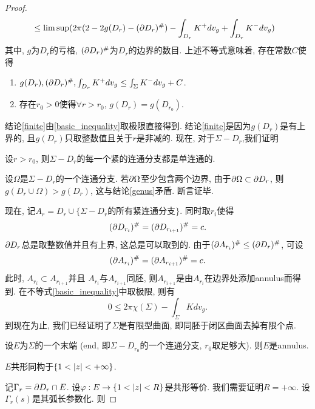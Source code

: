 \begin{proof}
\begin{equation}
\begin{split}
            & \le \limsup (2\pi(2-2g(D_r)-(\P D_r)^\#)-\int_{D_r}K^+dv_g+\int_{D_r}K^-dv_g)
        \end{split}
    \end{equation}
    其中, $g$为$D_r$的亏格, $(\P D_r)^\#$为$D_r$的边界的数目. 上述不等式意味着, 存在常数$C$使得
    \begin{enumerate}
        \item $g(D_r), (\P D_r)^\#, \int_{D_r}K^+dv_g \le \int_\Sigma K^-dv_g +C$. \label{finite}
        \item 存在$r_0>0$使得$\forall r > r_0$, $g(D_r) = g(D_{r_0})$. \label{genus}
    \end{enumerate}
    结论\eqref{finite}由\eqref{basic_inequality}取极限直接得到. 结论\eqref{finite}是因为$g(D_r)$是有上界的, 且$g(D_r)$只取整数值且关于$r$是非减的. 现在, 对于$\Sigma - D_r$,我们证明
    \begin{claim}
        设$r > r_0$, 则$\Sigma - D_r$的每一个紧的连通分支都是单连通的.
    \end{claim}
    设$\Omega$是$\Sigma - D_r$的一个连通分支. 若$\P \Omega$至少包含两个边界, 由于$\P \Omega \subset \P D_r$, 则$g(D_r \cup \Omega) > g(D_r)$, 这与结论\eqref{genus}矛盾. 断言证毕.
    \par 现在, 记$A_r=D_r\cup \{\Sigma - D_r\text{的所有紧连通分支}\}$. 同时取$r_i$使得
    \begin{equation}
        (\P D_{r_i})^\# = (\P D_{r_{i+1}})^\#=c.
    \end{equation}
    $\P D_{r}$总是取整数值并且有上界, 这总是可以取到的. 由于$(\P A_{r_i})^\# \le (\P D_r)^\#$, 可设
    \begin{equation}
        (\P A_{r_i})^\# = (\P A_{r_{i+1}})^\#=c.
    \end{equation}
    此时, $A_{r_i} \subset A_{r_{i+1}}$并且 $A_{r_i}$与$A_{r_{i+1}}$同胚, 则$A_{r_{i+1}}$是由$A_{r_i}$在边界处添加annulus而得到. 在不等式\eqref{basic_inequality}中取极限, 则有
    \begin{equation}
        0 \le 2\pi \chi(\Sigma) - \int_\Sigma K dv_g.
    \end{equation}
    到现在为止, 我们已经证明了$\Sigma$是有限型曲面, 即同胚于闭区曲面去掉有限个点.
    \par 设$E$为$\Sigma$的一个末端 (end, 即$\Sigma-D_{r_0}$的一个连通分支, $r_0$取足够大). 则$E$是annulus. 
    \begin{claim}
        $E$共形同构于$\{1 < \abs{z} < +\infty\}$.
    \end{claim}
    记$\Gamma_r=\P D_r \cap E$. 设$\phi: E \to \{ 1 < \abs{z} < R\}$是共形等价. 我们需要证明$R=+\infty$. 设$\Gamma_r(s)$是其弧长参数化. 则

\end{proof}

